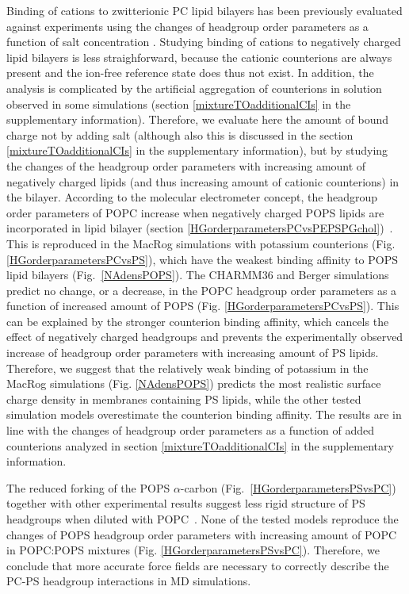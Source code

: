 \documentclass[aps,prl,superscriptaddress,twocolumn]{revtex4}
\begin{document}
Binding of cations to zwitterionic PC lipid bilayers has been previously
evaluated against experiments using the changes of headgroup order parameters
as a function of salt concentration \cite{catte16}.
Studying binding of cations to negatively charged lipid bilayers is less straighforward,
because the cationic counterions are always present and the ion-free reference state does thus not exist.
In addition, the analysis is complicated by the artificial aggregation of counterions
in solution observed in some simulations (section \ref{mixtureTOadditionalCIs} in the supplementary information).
Therefore, we evaluate here the amount of bound charge not by adding salt
(although also this is discussed in the section \ref{mixtureTOadditionalCIs} in the supplementary information),
but by studying the changes of the headgroup order parameters with increasing amount of
negatively charged lipids (and thus increasing amount of cationic counterions) in the bilayer.
According to the molecular electrometer concept, the headgroup order parameters of POPC
increase when negatively charged POPS lipids are incorporated in lipid bilayer
(section \ref{HGorderparametersPCvsPEPSPGchol})~\cite{seelig87,scherer87}.
This is reproduced in the MacRog simulations with potassium counterions (Fig. \ref{HGorderparametersPCvsPS}),
which have the weakest binding affinity to POPS lipid bilayers (Fig.~\ref{NAdensPOPS}).
The CHARMM36 and Berger simulations predict no change, or a decrease,
in the POPC headgroup order parameters as a function of increased amount of POPS (Fig. \ref{HGorderparametersPCvsPS}).
This can be explained by the stronger counterion binding affinity, which cancels
the effect of negatively charged headgroups and prevents the experimentally observed
increase of headgroup order parameters with increasing amount of PS lipids.
Therefore, we suggest that the relatively weak binding of potassium
in the MacRog simulations (Fig. \ref{NAdensPOPS}) predicts the most
realistic surface charge density in membranes containing PS lipids,
while the other tested simulation models overestimate the counterion
binding affinity. The results are in line with the changes of headgroup order
parameters as a function of added counterions analyzed in section \ref{mixtureTOadditionalCIs}
in the supplementary information.

The reduced forking of the POPS $\alpha$-carbon (Fig.~\ref{HGorderparametersPSvsPC})
together with other experimental results suggest less rigid structure of PS headgroups when diluted with
POPC~\cite{browning80,buldt81,roux90,roux91,scherer87}.
None of the tested models reproduce the changes of POPS headgroup order
parameters with increasing amount of POPC in POPC:POPS mixtures (Fig. \ref{HGorderparametersPSvsPC}).
Therefore, we conclude that more accurate force fields are necessary
to correctly describe the PC-PS headgroup interactions in MD simulations.
\end{document}

